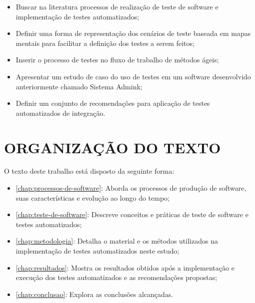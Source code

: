 \begin{itemize}
    \item Buscar na literatura processos de realização de teste de software e implementação de testes automatizados;
    \item Definir uma forma de representação dos cenários de teste baseada em mapas mentais para facilitar a definição dos testes a serem feitos;
    \item Inserir o processo de testes no fluxo de trabalho de métodos ágeis;
    \item Apresentar um estudo de caso do uso de testes em um software desenvolvido anteriormente chamado Sistema Admink;
    \item Definir um conjunto de recomendações para aplicação de testes automatizados de integração.
    
\end{itemize}

\section{ORGANIZAÇÃO DO TEXTO}
O texto deste trabalho está disposto da seguinte forma:
\begin{itemize}
    \item \autoref{chap:processos-de-software}: Aborda os processos de produção de software, suas características e evolução ao longo do tempo;
    \item \autoref{chap:teste-de-software}: Descreve conceitos e práticas de teste de software e testes automatizados;
    \item \autoref{chap:metodologia}: Detalha o material e os métodos utilizados na implementação de testes automatizados neste estudo;
    \item \autoref{chap:resultados}: Mostra os resultados obtidos após a implementação e execução dos testes automatizados e as recomendações propostas;
    \item \autoref{chap:conclusao}: Explora as conclusões alcançadas.
\end{itemize}